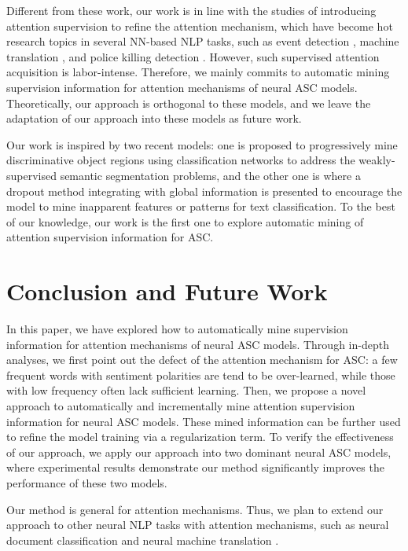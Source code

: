 \documentclass[11pt,a4paper]{article}
\begin{document}
Different from these work,
our work is in line with the studies of introducing attention supervision to refine the attention mechanism,
which have become hot research topics in several NN-based NLP tasks, such as
event detection \cite{Liu:ACL2017},
machine translation \cite{Liu:COLING2016},
and police killing detection \cite{Nguyen:COLING2018}.
However,
such supervised attention acquisition is labor-intense.
Therefore,
we mainly commits to automatic mining supervision information for attention mechanisms of neural ASC models.
Theoretically,
our approach is orthogonal to these models,
and we leave the adaptation of our approach into these models as future work.

Our work is inspired by two recent models:
one is \cite{Wei:CVPR2017} proposed to progressively mine discriminative object regions using classification networks to address the weakly-supervised semantic segmentation problems,
and the other one is \cite{Xu:CONLL2018}
where a dropout method integrating with global information is presented to encourage the model to mine inapparent features or patterns for text classification.
To the best of our knowledge,
our work is the first one to explore automatic mining of attention supervision information for ASC.




\section{Conclusion and Future Work}
In this paper,
we have explored how to automatically mine supervision information for attention mechanisms of neural ASC models.
Through in-depth analyses,
we first point out the defect of the attention mechanism for ASC:
a few frequent words with sentiment polarities are tend to be over-learned,
while those with low frequency often lack sufficient learning.
Then,
we propose a novel approach to automatically and incrementally mine attention supervision information for neural ASC models.
These mined information can be further used to refine the model training via a regularization term.
To verify the effectiveness of our approach,
we apply our approach into two
dominant neural ASC models,
where experimental results demonstrate our method significantly improves
the performance of these two models.

Our method is general for attention mechanisms.
Thus,
we plan to extend our approach to other neural NLP tasks with attention mechanisms,
such as neural document classification \cite{Yang:NAACL2016} and neural machine translation \cite{Zhang:TPAMI2018}.
\end{document}
